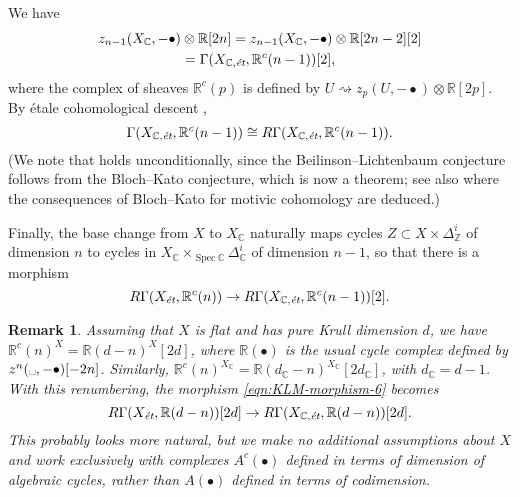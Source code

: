 \documentclass[10pt,a4paper,oneside]{article}
\DeclareMathOperator{\Spec}{Spec}
\newcommand{\CC}{\mathbb{C}}
\newcommand{\RR}{\mathbb{R}}
\newcommand{\ZZ}{\mathbb{Z}}
\newcommand{\et}{\text{\it \'{e}t}}
\theoremstyle{myplain}
\theoremstyle{mydefinition}
\newtheorem{remark}[theorem]{Remark}
\numberwithin{equation}{section}
\begin{document}
We have
\begin{multline}
  \label{eqn:KLM-morphism-4}
  z_{n-1} (X_\CC, -\bullet) \otimes \RR [2n] =
  z_{n-1} (X_\CC, -\bullet) \otimes \RR [2n-2] [2] \\
  = \Gamma (X_{\CC,\et}, \RR^c (n-1)) [2],
\end{multline}
where the complex of sheaves $\RR^c (p)$ is defined by
$U \rightsquigarrow z_p (U, -\bullet) \otimes \RR [2p]$.
By \'{e}tale cohomological descent \cite[Theorem~3.1]{Geisser-2010},
\begin{equation}
  \label{eqn:KLM-morphism-5}
  \Gamma (X_{\CC,\et}, \RR^c (n-1)) \cong R\Gamma (X_{\CC,\et}, \RR^c (n-1)).
\end{equation}
(We note that \cite[Theorem~3.1]{Geisser-2010} holds unconditionally, since the
Beilinson--Lichtenbaum conjecture follows from the Bloch--Kato conjecture, which
is now a theorem; see also \cite{Geisser-2004-Dedekind} where the consequences
of Bloch--Kato for motivic cohomology are deduced.)

Finally, the base change from $X$ to $X_\CC$ naturally maps cycles
$Z \subset X \times \Delta_\ZZ^i$ of dimension $n$ to cycles in
$X_\CC \times_{\Spec \CC} \Delta_\CC^i$ of dimension $n-1$, so that there is a
morphism
\begin{equation}
  \label{eqn:KLM-morphism-6}
  R\Gamma (X_\et, \RR^c (n)) \to R\Gamma (X_{\CC,\et}, \RR^c (n-1)) [2].
\end{equation}

\begin{remark}
  Assuming that $X$ is flat and has pure Krull dimension $d$, we have
  $\RR^c (n)^X = \RR (d-n)^X [2d]$, where $\RR (\bullet)$ is the usual cycle
  complex defined by $z^n (\text{\textvisiblespace}, -\bullet) [-2n]$.
  Similarly, $\RR^c (n)^{X_\CC} = \RR (d_\CC-n)^{X_\CC} [2d_\CC]$, with
  $d_\CC = d - 1$. With this renumbering, the morphism
  \eqref{eqn:KLM-morphism-6} becomes
  $$R\Gamma (X_\et, \RR (d-n)) [2d] \to R\Gamma (X_{\CC,\et}, \RR (d-n)) [2d].$$
  This probably looks more natural, but we make no additional assumptions about
  $X$ and work exclusively with complexes $A^c (\bullet)$ defined in terms of
  dimension of algebraic cycles, rather than $A (\bullet)$ defined in terms of
  codimension.
\end{remark}
\end{document}

